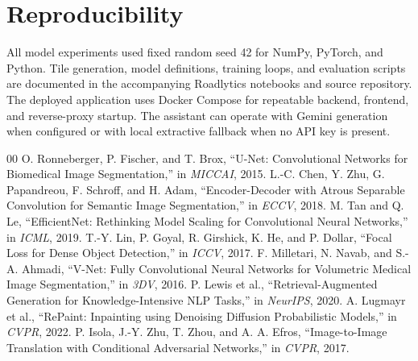 ﻿\documentclass[conference]{IEEEtran}
\begin{document}
\section*{Reproducibility}
All model experiments used fixed random seed 42 for NumPy, PyTorch, and Python. Tile generation, model definitions, training loops, and evaluation scripts are documented in the accompanying Roadlytics notebooks and source repository. The deployed application uses Docker Compose for repeatable backend, frontend, and reverse-proxy startup. The assistant can operate with Gemini generation when configured or with local extractive fallback when no API key is present.

\begin{thebibliography}{00}
 O. Ronneberger, P. Fischer, and T. Brox, ``U-Net: Convolutional Networks for Biomedical Image Segmentation,'' in \emph{MICCAI}, 2015.
 L.-C. Chen, Y. Zhu, G. Papandreou, F. Schroff, and H. Adam, ``Encoder-Decoder with Atrous Separable Convolution for Semantic Image Segmentation,'' in \emph{ECCV}, 2018.
 M. Tan and Q. Le, ``EfficientNet: Rethinking Model Scaling for Convolutional Neural Networks,'' in \emph{ICML}, 2019.
 T.-Y. Lin, P. Goyal, R. Girshick, K. He, and P. Dollar, ``Focal Loss for Dense Object Detection,'' in \emph{ICCV}, 2017.
 F. Milletari, N. Navab, and S.-A. Ahmadi, ``V-Net: Fully Convolutional Neural Networks for Volumetric Medical Image Segmentation,'' in \emph{3DV}, 2016.
 P. Lewis et al., ``Retrieval-Augmented Generation for Knowledge-Intensive NLP Tasks,'' in \emph{NeurIPS}, 2020.
 A. Lugmayr et al., ``RePaint: Inpainting using Denoising Diffusion Probabilistic Models,'' in \emph{CVPR}, 2022.
 P. Isola, J.-Y. Zhu, T. Zhou, and A. A. Efros, ``Image-to-Image Translation with Conditional Adversarial Networks,'' in \emph{CVPR}, 2017.
\end{thebibliography}
\end{document}
